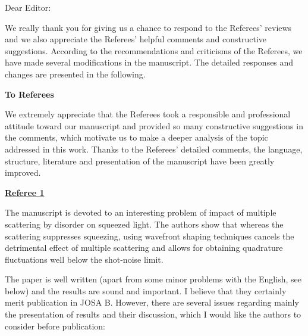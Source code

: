 \documentclass[10pt]{article}
\begin{document}
Dear Editor:

We really thank you for giving us a chance to respond to the Referees' reviews and we also appreciate the Referees' helpful comments and constructive suggestions. According to the recommendations and criticisms of the Referees, we have made several modiﬁcations in the manuscript. The detailed responses and changes are presented in the following.

{\bf{To Referees}}

We extremely appreciate that the Referees took a responsible and professional attitude toward our manuscript and provided so many constructive suggestions in the comments, which motivate us to make a deeper analysis of the topic addressed in this work. Thanks to the Referees' detailed comments, the language, structure, literature and presentation of the manuscript have been greatly improved.

\vspace{3mm}

\begin{center}
{\uline{\bf{Referee 1}}}
\end{center}
{\bf{The manuscript is devoted to an interesting problem of impact of multiple scattering by disorder on squeezed light. The authors show that whereas the scattering suppresses squeezing, using wavefront shaping techniques cancels the detrimental effect of multiple scattering and allows for obtaining quadrature fluctuations well below the shot-noise limit.

The paper is well written (apart from some minor problems with the English, see below) and the results are sound and important. I believe that they certainly merit publication in JOSA B. However, there are several issues regarding mainly the presentation of results and their discussion, which I would like the authors to consider before publication:
}}
\end{document}
